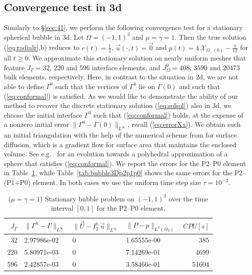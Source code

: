 \documentclass[a4paper,12pt,onecolumn]{article}
\newcommand{\bigchi}{\ensuremath{\mathrm{\mathcal{X}}}}
\newcommand{\charfcn}[1]{\bigchi_{#1}} %
\newcommand{\errorXx}{\|\Gamma^h - \Gamma\|_{L^\infty}}
\newcommand{\errorUu}[1]{\|\vec U - I^h_{#1}\,\vec u\|_{L^\infty}}
\newcommand{\LerrorPp}{\|P - p\|_{L^2(\Omega_T)}}
\begin{document}
\subsection{Convergence test in 3d} \label{sec:45}
Similarly to \S\ref{sec:41}, we perform the following convergence test for a
stationary spherical bubble in 3d. Let $\Omega = (-1,1)^3$ and
$\mu = \gamma = 1$. Then the true solution (\ref{eq:radialr},b) reduces to
$r(t) = \frac{1}{2}$, $\vec u(\cdot, t) = \vec 0$ and
$p(t) = 4\,\charfcn{\Omega_-(0)} - \frac{\pi}{12}$ for all $t\geq0$. We
approximate this stationary solution on nearly uniform meshes that feature
$J_\Gamma = 32$, $220$ and $596$ interface elements, and
$J_\Omega^0 = 408$, $3590$ and $20473$ bulk elements, respectively. Here, in
contrast to the situation in 2d, we are not able to define $\Gamma^0$
such that the vertices of $\Gamma^0$ lie on $\Gamma(0)$ and such that
(\ref{eq:conformal}) is satisfied. As we would like to demonstrate the ability
of our method to recover the discrete stationary solution (\ref{eq:solsol})
also in 3d, we choose the initial interface $\Gamma^0$ such that
(\ref{eq:conformal}) holds, at the expense of a nonzero initial error
$\| \Gamma^0 - \Gamma(0) \|_{L^\infty}$, recall (\ref{eq:errorXx}). We obtain
such an initial triangulation with the help of the numerical scheme from
\cite{gflows3d} for surface diffusion, which is a gradient flow for
surface area that maintains the enclosed volume. See
e.g.\ \cite[Fig.\ 11]{gflows3d} for an evolution towards a polyhedral
approximation of a sphere that satisfies (\ref{eq:conformal}). We report the
errors for the P2--P0 element in Table~\ref{tab:bubble3Dp2p0}, while
Table~\ref{tab:bubble3Dp2p1p0} shows the same errors for the P2--(P1+P0)
element. In both cases we use the uniform time step size $\tau = 10^{-2}$.
\begin{table}
\center
\begin{tabular}{rlllr}
\hline
$J_\Gamma$ & $\errorXx$ & $\errorUu2$ & $\LerrorPp$ & $CPU[s]$ \\
\hline
 32 & 2.97986e-02 & 0 & 1.65555e-00 &   385 \\
220 & 5.80971e-03 & 0 & 7.14269e-01 &  4699 \\
596 & 2.42857e-03 & 0 & 3.58466e-01 & 51604 \\
\hline
\end{tabular}
\caption{($\mu=\gamma=1$) Stationary bubble problem on $(-1,1)^3$ over the time
interval $[0,1]$ for the P2--P0 element.}
\label{tab:bubble3Dp2p0}
\end{table}
\end{document}
